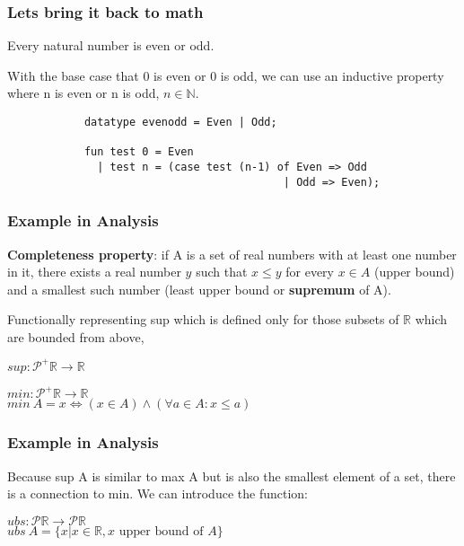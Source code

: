\documentclass[handout]{beamer}
\newcommand{\R}{\mathbb{R}}
\newcommand{\N}{\mathbb{N}}
\begin{document}
    \begin{frame}[fragile]
        \frametitle{Lets bring it back to math}

        Every natural number is even or odd.

        With the base case that 0 is even or 0 is odd, we can use an inductive property where n is even or n is odd, $n \in \N$.

        \scriptsize
        \begin{verbatim}
            datatype evenodd = Even | Odd;

            fun test 0 = Even
              | test n = (case test (n-1) of Even => Odd
                                           | Odd => Even);
        \end{verbatim}
    \end{frame}

    \begin{frame}
        \frametitle{Example in Analysis}

        \textbf{Completeness property}: if A is a set of real numbers with at least one number in it, there exists a real number $y$ such that $x \leq y$ for every $x \in A$ (upper bound) and a smallest such number (least upper bound or \textbf{supremum} of A).

        Functionally representing sup which is defined only for those subsets of $\R$ which are bounded from above,

        $sup: \mathcal{P}^+ \R \rightarrow \R$ \pause

        \vspace{10px}

        $min: \mathcal{P}^+ \R \rightarrow \R$\\
        $min\ A = x \Longleftrightarrow  (x \in A) \land (\forall a \in A : x \leq a)$

    \end{frame}

    \begin{frame}
        \frametitle{Example in Analysis}

        Because sup A is similar to max A but is also the smallest element of a set, there is a connection to min. We can introduce the function:

        $ubs: \mathcal{P}\R \rightarrow \mathcal{P}\R$\\
        $ubs\ A = \{x | x \in \R, x \text{ upper bound of } A\}$
    \end{frame}
\end{document}
